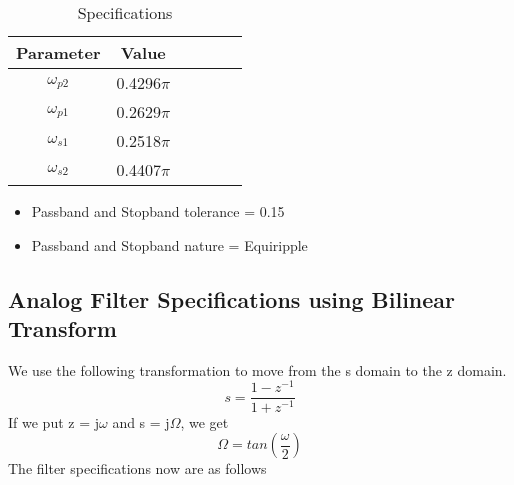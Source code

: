 \documentclass[12pt]{article}
\begin{document}
\begin{table}[!hbt]
		\begin{center}
		\caption{Specifications}
		\begin{tabular}{|c|c|c|c|c|c|}
			\hline
			  Parameter & Value \\
			\hline
			 $\omega_{p2}$& 0.4296$\pi$ \\
			\hline
			 $\omega_{p1}$ &  0.2629$\pi$\\
			\hline
			 $\omega_{s1}$ & 0.2518$\pi$\\
			\hline
		     $\omega_{s2}$ & 0.4407$\pi$\\
			\hline
		
		\end{tabular}
		\end{center}
\end{table}


\begin{itemize}
    \item Passband and Stopband tolerance = 0.15
    \item Passband and Stopband nature = Equiripple
\end{itemize}






\subsection{\textbf{Analog Filter Specifications using Bilinear Transform}}
We use the following transformation to move from the s domain to the z
domain.
\begin{equation*}
    s = \frac{1-z^{-1}}{1+z^{-1}}
    
\end{equation*}
If we put z = j$\omega$ and s = j$\Omega$, we get
\begin{equation*}
    \Omega = tan(\frac{\omega}{2})
\end{equation*}
The filter specifications now are as follows
\end{document}
